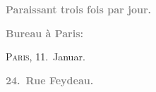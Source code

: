 \pstart
           \begin{otherlanguage}{french}\textcolor{gray}{\textbf{\textbf{Paraissant trois fois par jour.}}}\end{otherlanguage}\pend
           
\pstart
           \begin{otherlanguage}{french}\textcolor{gray}{\textbf{\textbf{Bureau à Paris:}}}\end{otherlanguage}\hfill \textsc{Paris}, 11. Januar.\pend
           
\pstart
           \begin{otherlanguage}{french}\textcolor{gray}{\textbf{\textbf{24. Rue Feydeau.}}}\end{otherlanguage}\pend
           
